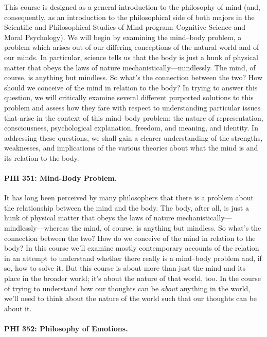 \documentclass[%
  11pt,%
]{article}
\begin{document}
This course is designed as a general introduction to the philosophy of mind (and, consequently, as an introduction to the philosophical side of both majors in the Scientific and Philosophical Studies of Mind program: Cognitive Science and Moral Psychology). We will begin by examining the mind--body problem, a problem which arises out of our differing conceptions of the natural world and of our minds. In particular, science tells us that the body is just a hunk of physical matter that obeys the laws of nature mechanistically---mindlessly. The mind, of course, is anything but mindless. So what's the connection between the two? How should we conceive of the mind in relation to the body? In trying to answer this question, we will critically examine several different purported solutions to this problem and assess how they fare with respect to understanding particular issues that arise in the context of this mind--body problem: the nature of representation, consciousness, psychological explanation, freedom, and meaning, and identity. In addressing these questions, we shall gain a clearer understanding of the strengths, weaknesses, and implications of the various theories about what the mind is and its relation to the body.

\paragraph{PHI 351: Mind-Body Problem.}

It has long been perceived by many philosophers that there is a problem about the relationship between the mind and the body. The body, after all, is just a hunk of physical matter that obeys the laws of nature mechanistically---mindlessly---whereas the mind, of course, is anything but mindless. So what's the connection between the two? How do we conceive of the mind in relation to the body? In this course we'll examine mostly contemporary accounts of the relation in an attempt to understand whether there really is a mind--body problem and, if so, how to solve it. But this course is about more than just the mind and its place in the broader world; it's about the nature of that world, too. In the course of trying to understand how our thoughts can be \emph{about} anything in the world, we'll need to think about the nature of the world such that our thoughts can be about it.

\paragraph{PHI 352: Philosophy of Emotions.}
\end{document}
